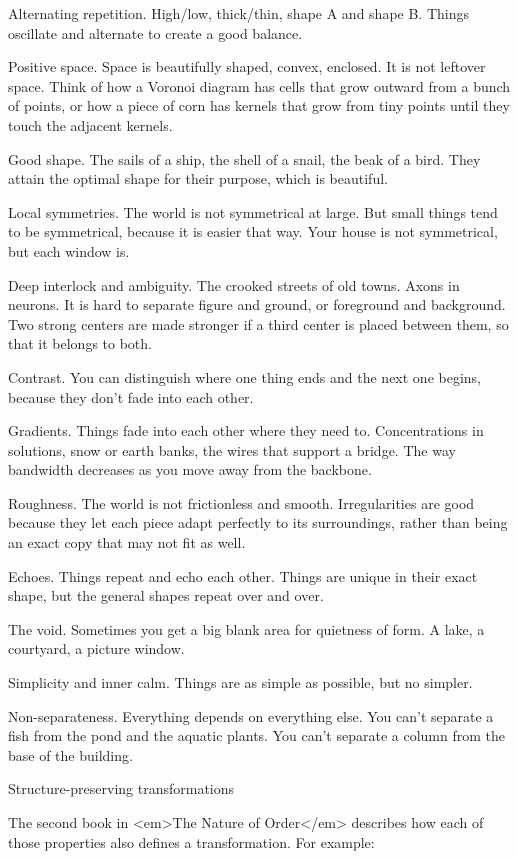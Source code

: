 Alternating repetition. High/low, thick/thin, shape A and shape B.  Things oscillate and alternate to create a good balance.

Positive space.  Space is beautifully shaped, convex, enclosed.  It is not leftover space.  Think of how a Voronoi diagram has cells that grow outward from a bunch of points, or how a piece of corn has kernels that grow from tiny points until they touch the adjacent kernels.

Good shape.  The sails of a ship, the shell of a snail, the beak of a bird.  They attain the optimal shape for their purpose, which is beautiful.

Local symmetries.  The world is not symmetrical at large.  But small things tend to be symmetrical, because it is easier that way. Your house is not symmetrical, but each window is.

Deep interlock and ambiguity. The crooked streets of old towns.  Axons in neurons.  It is hard to separate figure and ground, or foreground and background.  Two strong centers are made stronger if a third center is placed between them, so that it belongs to both.

Contrast.  You can distinguish where one thing ends and the next one begins, because they don't fade into each other.

Gradients.  Things fade into each other where they need to.  Concentrations in solutions, snow or earth banks, the wires that support a bridge.  The way bandwidth decreases as you move away from the backbone.

Roughness.  The world is not frictionless and smooth.  Irregularities are good because they let each piece adapt perfectly to its surroundings, rather than being an exact copy that may not fit as well.

Echoes. Things repeat and echo each other.  Things are unique in their exact shape, but the general shapes repeat over and over.

The void.  Sometimes you get a big blank area for quietness of form.  A lake, a courtyard, a picture window.

Simplicity and inner calm. Things are as simple as possible, but no simpler.

Non-separateness. Everything depends on everything else.  You can't separate a fish from the pond and the aquatic plants.  You can't separate a column from the base of the building.

Structure-preserving transformations

The second book in <em>The Nature of Order</em> describes how each of those properties also defines a transformation.  For example:

